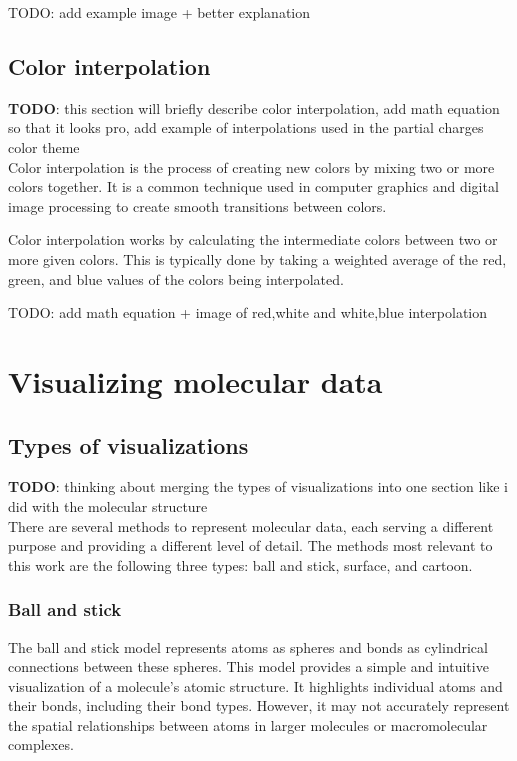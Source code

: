\documentclass[
  digital,     %
  oneside,     %
  nosansbold,  %
  nocolorbold, %
  lof,         %
  lot,         %
]{fithesis4}
\begin{document}
TODO: add example image + better explanation

\section{Color interpolation}
\label{section:color_interpolation}

\textbf{TODO}: this section will briefly describe color interpolation, add math equation so that it looks pro, add example of interpolations used in the partial charges color theme \\

Color interpolation is the process of creating new colors by mixing two or more colors together. It is a common technique used in computer graphics and digital image processing to create smooth transitions between colors.

Color interpolation works by calculating the intermediate colors between two or more given colors. This is typically done by taking a weighted average of the red, green, and blue values of the colors being interpolated.

TODO: add math equation + image of red,white and white,blue interpolation

\chapter{Visualizing molecular data}
\label{chapter:visualizing_molecular_data}

\section{Types of visualizations}
\label{section:types_of_visualizations}

\textbf{TODO}: thinking about merging the types of visualizations into one section like i did with the molecular structure \\

There are several methods to represent molecular data, each serving a different purpose and providing a different level of detail. The methods most relevant to this work are the following three types: ball and stick, surface, and cartoon.

\subsection{Ball and stick}
\label{subsection:ball_and_stick}

The ball and stick model represents atoms as spheres and bonds as cylindrical connections between these spheres. This model provides a simple and intuitive visualization of a molecule's atomic structure. It highlights individual atoms and their bonds, including their bond types. However, it may not accurately represent the spatial relationships between atoms in larger molecules or macromolecular complexes.
\end{document}

